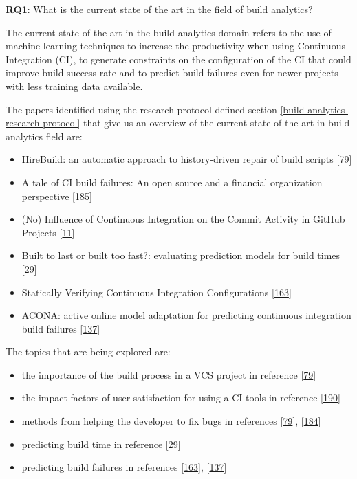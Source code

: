 \documentclass[]{book}
\providecommand{\tightlist}{%
  \setlength{\itemsep}{0pt}\setlength{\parskip}{0pt}}
\begin{document}
\textbf{RQ1}: What is the current state of the art in the field of build
analytics?

The current state-of-the-art in the build analytics domain refers to the
use of machine learning techniques to increase the productivity when
using Continuous Integration (CI), to generate constraints on the
configuration of the CI that could improve build success rate and to
predict build failures even for newer projects with less training data
available.

The papers identified using the research protocol defined section
\ref{build-analytics-research-protocol} that give us an overview of the
current state of the art in build analytics field are:

\begin{itemize}
\tightlist
\item
  HireBuild: an automatic approach to history-driven repair of build
  scripts {[}\protect\hyperlink{ref-hassan2018hirebuild}{79}{]}
\item
  A tale of CI build failures: An open source and a financial
  organization perspective
  {[}\protect\hyperlink{ref-vassallo2017tale}{185}{]}
\item
  (No) Influence of Continuous Integration on the Commit Activity in
  GitHub Projects {[}\protect\hyperlink{ref-baltes2018no}{11}{]}
\item
  Built to last or built too fast?: evaluating prediction models for
  build times {[}\protect\hyperlink{ref-bisong2017built}{29}{]}
\item
  Statically Verifying Continuous Integration Configurations
  {[}\protect\hyperlink{ref-santolucito2018statically}{163}{]}
\item
  ACONA: active online model adaptation for predicting continuous
  integration build failures
  {[}\protect\hyperlink{ref-ni2018acona}{137}{]}
\end{itemize}

The topics that are being explored are:

\begin{itemize}
\tightlist
\item
  the importance of the build process in a VCS project in reference
  {[}\protect\hyperlink{ref-hassan2018hirebuild}{79}{]}
\item
  the impact factors of user satisfaction for using a CI tools in
  reference {[}\protect\hyperlink{ref-widder2018m}{190}{]}
\item
  methods from helping the developer to fix bugs in references
  {[}\protect\hyperlink{ref-hassan2018hirebuild}{79}{]},
  {[}\protect\hyperlink{ref-vassallo2018break}{184}{]}
\item
  predicting build time in reference
  {[}\protect\hyperlink{ref-bisong2017built}{29}{]}
\item
  predicting build failures in references
  {[}\protect\hyperlink{ref-santolucito2018statically}{163}{]},
  {[}\protect\hyperlink{ref-ni2018acona}{137}{]}
\end{itemize}
\end{document}
